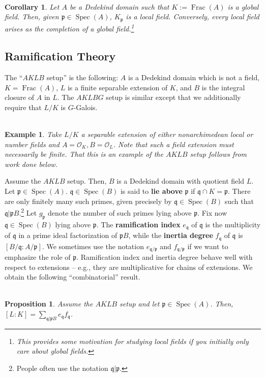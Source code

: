 \documentclass[11pt]{article}
\newcommand{\mc}[1]{\mathcal{#1}}
\newcommand{\mf}[1]{\mathfrak{#1}}
\DeclareMathOperator{\Frac}{Frac}
\DeclareMathOperator{\Spec}{Spec}
\renewcommand{\O}{\mc{O}}
\newtheorem*{corollary*}{\\Corollary}
\newtheorem*{example*}{\\Example}
\newtheorem*{proposition*}{\\Proposition}
\begin{document}
\begin{corollary*}
Let $A$ be a Dedekind domain such that $K:=\Frac(A)$ is a global field. Then, given $\mf{p}\in\Spec(A)$, $K_{\mf{p}}$ is a local field. Conversely, every local field arises as the completion of a global field.\footnote{This provides some motivation for studying local fields if you initially only care about global fields.}
\end{corollary*}

\subsection{Ramification Theory}
The ``$AKLB$ setup'' is the following: $A$ is a Dedekind domain which is not a field, $K=\Frac(A)$, $L$ is a finite separable extension of $K$, and $B$ is the integral closure of $A$ in $L$. The $AKLBG$ setup is similar except that we additionally require that $L/K$ is $G$-Galois. 

\begin{example*}
Take $L/K$ a separable extension of either nonarchimedean local or number fields and $A=\O_K,B=\O_L$. Note that such a field extension must necessarily be finite. That this is an example of the $AKLB$ setup follows from work done below.
\end{example*}

Assume the $AKLB$ setup. Then, $B$ is a Dedekind domain with quotient field $L$. Let $\mf{p}\in\Spec(A)$. $\mf{q}\in\Spec(B)$ is said to \textbf{lie above} $\mf{p}$ if $\mf{q}\cap K=\mf{p}$. There are only finitely many such primes, given precisely by $\mf{q}\in\Spec(B)$ such that $\mf{q}|\mf{p}B$.\footnote{People often use the notation $\mf{q}|\mf{p}$.} Let $g_{\mf{p}}$ denote the number of such primes lying above $\mf{p}$. Fix now $\mf{q}\in\Spec(B)$ lying above $\mf{p}$. The \textbf{ramification index} $e_{\mf{q}}$ of $\mf{q}$ is the multiplicity of $\mf{q}$ in a prime ideal factorization of $\mf{p}B$, while the \textbf{inertia degree} $f_{\mf{q}}$ of $\mf{q}$ is $[B/\mf{q}:A/\mf{p}]$. We sometimes use the notation $e_{\mf{q}/\mf{p}}$ and $f_{\mf{q}/\mf{p}}$ if we want to emphasize the role of $\mf{p}$. Ramification index and inertia degree behave well with respect to extensions -- e.g., they are multiplicative for chains of extensions. We obtain the following ``combinatorial'' result.

\begin{proposition*}
Assume the $AKLB$ setup and let $\mf{p}\in\Spec(A)$. Then, $[L:K]=\sum_{\mf{q}|\mf{p}B}e_{\mf{q}}f_{\mf{q}}$.
\end{proposition*}
\end{document}
